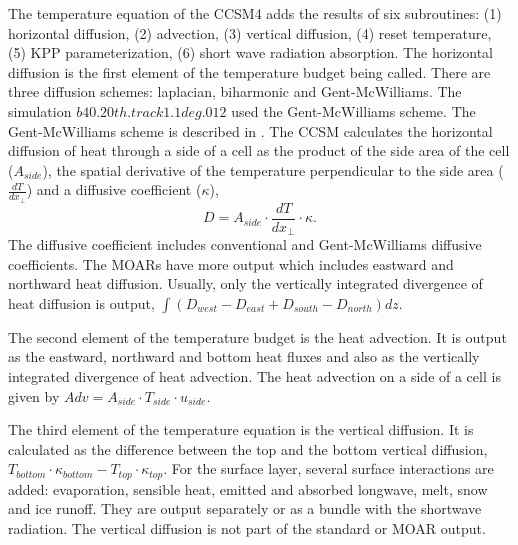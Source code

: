 The temperature equation of the CCSM4 adds the results of six subroutines: (1) horizontal diffusion, (2) advection, (3) vertical diffusion, (4) reset temperature, (5) KPP parameterization, (6) short wave radiation absorption. The horizontal diffusion is the first element of the temperature budget being called. There are three diffusion schemes: laplacian, biharmonic and Gent-McWilliams. The simulation $b40.20th.track1.1deg.012$ used the Gent-McWilliams scheme. The Gent-McWilliams scheme is described in \cite{Gent:1990zr}. The CCSM calculates the horizontal diffusion of heat through a side of a cell as the product of the side area of the cell ($A_{side}$), the spatial derivative of the temperature perpendicular to the side area ($\frac{dT}{dx_\perp}$) and a diffusive coefficient ($\kappa$),
\begin{equation}\label{hdeq}
D = A_{side}\cdot \frac{dT}{dx_\perp} \cdot \kappa.
\end{equation}
The diffusive coefficient includes conventional and Gent-McWilliams diffusive coefficients. The MOARs have more output which includes eastward and northward heat diffusion.  Usually, only the vertically integrated divergence of heat diffusion is output, $\int (D_{west}-D_{east} + D_{south} - D_{north}) dz$.

The second element of the temperature budget is the heat advection. It is output as the eastward, northward and bottom heat fluxes and also as the vertically integrated divergence of heat advection. The heat advection on a side of a cell is given by $Adv = A_{side}\cdot T_{side} \cdot u_{side}$.

The third element of the temperature equation is the vertical diffusion. It is calculated as the difference between the top and the bottom vertical diffusion, $T_{bottom}\cdot\kappa_{bottom} - T_{top}\cdot\kappa_{top}$. For the surface layer, several surface interactions are added: evaporation, sensible heat, emitted and absorbed longwave, melt, snow and ice runoff. They are output separately or as a bundle with the shortwave radiation. The vertical diffusion is not part of the standard or MOAR output. 


